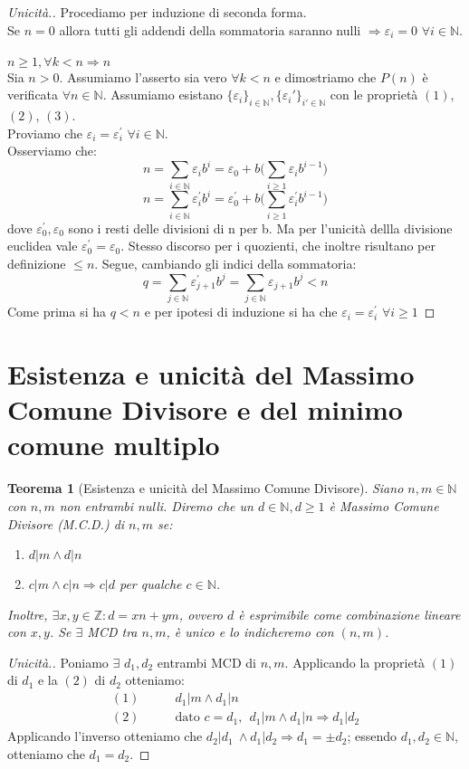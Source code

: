 \documentclass[12pt,twoscolu]{article}
\newcommand{\N}{\mathbb{N}}
\newcommand{\Z}{\mathbb{Z}}
\newcommand{\implica}{\Longrightarrow}
\newcommand{\nin}{\forall n\in\N}
\newcommand{\eps}{\varepsilon}
\newcommand{\pr}{\prime}
\renewcommand\qedsymbol{$\blacksquare$}
\newcommand{\baseinduz}[1]{\newline\newline {\boldmath$n = #1$}}
\newcommand{\induzdue}[1]{\\\\{\boldmath$n \ge #1, \forall k < n \implica n$}}
\newtheorem{theorem}{Teorema}
\begin{document}
\renewcommand\qedsymbol{$\blacksquare$}
\begin{proof}[Unicità.]
Procediamo per induzione di seconda forma.
\baseinduz{0}
\\Se $n = 0$ allora tutti gli addendi della sommatoria saranno nulli $\implica \eps_i = 0$ $\forall i \in \N$.
\induzdue{1}
\\ Sia $n > 0$. Assumiamo l'asserto sia vero $\forall k < n$ e dimostriamo che $P(n)$ è verificata $\nin$.
Assumiamo esistano $\{\eps_i\}_{i\in\N}, \{\eps_i'\}_{i' \in\N}$ con le proprietà $(1)$, $(2)$, $(3)$.\\Proviamo che $\eps_i = \eps_{i}^{\pr}$ $\forall i \in \N$.
\\Osserviamo che:
$$n =\sum_{i\in\N} \eps_i b^i = \eps_0 + b\Bigg( \sum_{i \ge 1} \eps_i b^{i-1}\Bigg)$$
$$n =\sum_{i\in\N} \eps_{i}^{\pr} b^i = \eps_{0}^{\pr} + b\Bigg( \sum_{i \ge 1} \eps_{i}^{\pr} b^{i-1}\Bigg)$$
dove $\eps_{0}^{\pr},\eps_{0}$ sono i resti delle divisioni di n per b. Ma per l'unicità dellla divisione euclidea vale $\eps_{0}^{\pr} = \eps_{0}$. Stesso discorso per i quozienti, che inoltre risultano per definizione $\le n$. Segue, cambiando gli indici della sommatoria:
\\$$q = \sum_{j\in\N} \eps_{j+1}^{\pr} b^j = \sum_{j\in\N} \eps_{j+1} b^j < n $$
Come prima si ha $q < n$ e per ipotesi di induzione si ha che $\eps_i = \eps_{i}^{\pr}$ $\forall i \ge 1$
\end{proof}

\section{Esistenza e unicità del Massimo Comune Divisore e del minimo comune multiplo}
\begin{theorem}[Esistenza e unicità del Massimo Comune Divisore]
Siano $n, m \in \N$ con $n, m$ non entrambi nulli. Diremo che un $d \in \N, d \ge 1$ è Massimo Comune Divisore (M.C.D.) di $n, m$ se:
\begin{enumerate}
\item$d | m \land d | n $
\item$c | m \land c | n \implica c | d$ per qualche $c \in \N$.
\end{enumerate}
Inoltre, $\exists x, y \in \Z : d = xn + ym$, ovvero $d$ è esprimibile come combinazione lineare con $x, y$.  Se $\exists$ MCD tra $n, m$, è unico e lo indicheremo con $(n, m)$.
\end{theorem}

\renewcommand\qedsymbol{$\square$}
\begin{proof}[Unicità.]
Poniamo $\exists$ $d_1, d_2$ entrambi MCD di $n, m$. Applicando la proprietà $(1)$ di $d_1$ e la $(2)$ di $d_2$ otteniamo:
\begin{align*}
(1)\qquad& d_1 | m \land d_1 | n \\
(2)\qquad& \text{dato }c = d_1, \ \ d_1 | m \land d_1 | n \implica d_1 | d_2
\end{align*}
Applicando l'inverso otteniamo che $d_2 | d_1\ \land d_1 | d_2 \implica d_1 = \pm d_2$; essendo $d_1, d_2 \in \N$, otteniamo che
$ d_1 = d_2$.
\end{proof}
\end{document}
